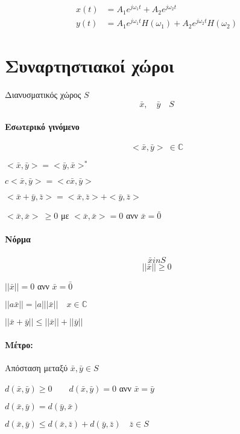 \documentclass[11pt,a4paper,titlepage,fleqn]{article}
\begin{document}
	\begin{align*}
	x(t) &= A_1e^{j\omega_1 t} + A_2e^{j\omega_2 t} \\
	y(t) &= A_1e^{j\omega_1 t}H(\omega_1)+A_2e^{j\omega_2t}H(\omega_2)
	\end{align*}
	
	\section{Συναρτηστιακοί χώροι}
	Διανυσματικός χώρος \( S \)
	\[
	\bar x,\quad \bar y\quad S
	\]
	
	\paragraph{Εσωτερικό γινόμενο}
	\[ <\bar x,\bar y>\ \in \mathbb C  \]
	\begin{enumpar}
		\item \( <\bar x,\bar y> = <\bar y,\bar x>^* \)
		\item \( c<\bar x,\bar y>=<c\bar x,\bar y> \)
		\item \( <\bar x+\bar y,\bar z> = <\bar x,\bar z>+<\bar y,\bar z> \)
		\item \( <\bar x,\bar x> \ \geq 0 \) με
		\( <\bar x,\bar x> = 0 \) ανν \( \bar x = \bar 0 \)
	\end{enumpar}
	
	\paragraph{Νόρμα}
	\[
	\bar x in S
	\]\[
	||\bar x|| \geq0
	\]
	\begin{enumpar}
		\item \( ||\bar x|| = 0 \) ανν \( \bar x = \bar 0 \)
		\item \( ||a\bar x|| = |a|||\bar x|| \quad x \in\mathbb C \)
		\item \( ||\bar x+\bar y|| \leq ||\bar x|| + ||\bar y|| \)
	\end{enumpar}
	\paragraph{Μέτρο:} Απόσταση μεταξύ \( \bar x,\bar y \in S \)
	\begin{enumpar}
		\item \( d(\bar x,\bar y)\geq 0 \qquad d(\bar x,\bar y)=0 \)
		ανν \( \bar x = \bar y \)
		\item \( d(\bar x,\bar y) = d(\bar y,\bar x) \)
		\item \( d(\bar x,\bar y) \leq d(\bar x,\bar z) + d(\bar y,\bar z)
		\quad \bar z\in S
		 \)
		
    \end{enumpar}
\end{document}
